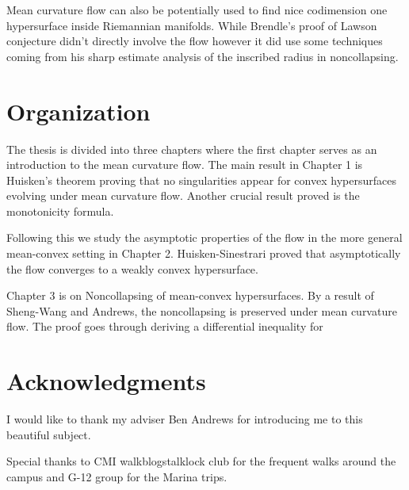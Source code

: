 Mean curvature flow can also be potentially used to find nice codimension one hypersurface inside Riemannian manifolds. While Brendle's proof of Lawson conjecture didn't directly involve the flow however it did use some techniques coming from his sharp estimate analysis of the inscribed radius in noncollapsing. 

\section*{Organization}

The thesis is divided into three chapters where the first chapter serves as an introduction to the mean curvature flow. The main result in Chapter 1 is Huisken's theorem proving that no singularities appear for convex hypersurfaces evolving under mean curvature flow. Another crucial result proved is the monotonicity formula. 

Following this we study the asymptotic properties of the flow in the more general mean-convex setting in Chapter 2. Huisken-Sinestrari proved that asymptotically the flow converges to a weakly convex hypersurface.  

Chapter 3 is on Noncollapsing of mean-convex hypersurfaces. By a result of Sheng-Wang and Andrews, the noncollapsing is preserved under mean curvature flow. The proof goes through deriving a differential inequality for 

\section*{Acknowledgments}

I would like to thank my adviser Ben Andrews for introducing me to this beautiful subject. 

Special thanks to CMI walkblogstalklock club for the frequent walks around the campus and G-12 group for the Marina trips. 